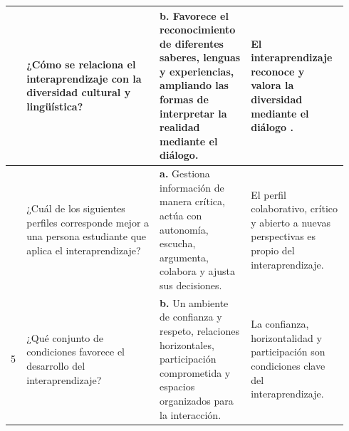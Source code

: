 \documentclass[
  spanish,
  letterpaper, oneside
]{article}
\begin{document}
\begin{landscape}
\begin{longtable}{@{}>{\centering\arraybackslash}p{0.045\linewidth}>{\raggedright\arraybackslash}p{0.37\linewidth}>{\raggedright\arraybackslash}p{0.25\linewidth}>{\raggedright\arraybackslash}p{0.27\linewidth}@{}}
\midrule
3 & ¿Cómo se relaciona el interaprendizaje con la diversidad cultural y lingüística? & \textbf{b.} Favorece el reconocimiento de diferentes saberes, lenguas y experiencias, ampliando las formas de interpretar la realidad mediante el diálogo. & El interaprendizaje reconoce y valora la diversidad mediante el diálogo \citep{pech2016manual}. \\
\midrule
4 & ¿Cuál de los siguientes perfiles corresponde mejor a una persona estudiante que aplica el interaprendizaje? & \textbf{a.} Gestiona información de manera crítica, actúa con autonomía, escucha, argumenta, colabora y ajusta sus decisiones. & El perfil colaborativo, crítico y abierto a nuevas perspectivas es propio del interaprendizaje. \\
\midrule
5 & ¿Qué conjunto de condiciones favorece el desarrollo del interaprendizaje? & \textbf{b.} Un ambiente de confianza y respeto, relaciones horizontales, participación comprometida y espacios organizados para la interacción. & La confianza, horizontalidad y participación son condiciones clave del interaprendizaje. \\
\midrule

\end{longtable}
\end{landscape}
\end{document}
